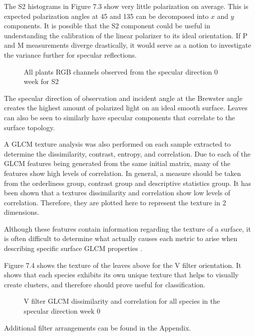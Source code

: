 The S2 histograms in Figure 7.3 show very little polarization on average.  This is expected polarization angles at 45 and 135 can be decomposed into $x$ and $y$ components.  It is possible that the S2 component could be useful in understanding the calibration of the linear polarizer to its ideal orientation.  If P and M measurements diverge drastically, it would serve as a notion to investigate the variance further for specular reflections.
%
\begin{figure}[!htb]
    \begin{center}
    \end{center}
    \caption{All plants RGB channels observed from the specular direction 0 week for S2}
    \label{fig:polarization}
\end{figure}
%
The specular direction of observation and incident angle at the Brewster angle creates the highest amount of polarized light on an ideal smooth surface.  Leaves can also be seen to similarly have specular components that correlate to the surface topology.

A GLCM texture analysis was also performed on each sample extracted to determine the dissimilarity, contrast, entropy, and correlation. Due to each of the GLCM features being generated from the same initial matrix, many of the features show high levels of correlation.  In general, a measure should be taken from the orderliness group, contrast group and descriptive statistics group. It has been shown that a textures dissimilarity and correlation show low levels of correlation.  Therefore, they are plotted here to represent the texture in 2 dimensions.

Although these features contain information regarding the texture of a surface, it is often difficult to determine what actually causes each metric to arise when describing specific surface GLCM properties \cite{haralick}.

Figure 7.4 shows the texture of the leaves above for the V filter orientation.  It shows that each species exhibits its own unique texture that helps to visually create clusters, and therefore should prove useful for classification.
%
\begin{figure}[!htb]
    \begin{center}
    \end{center}
    \caption{V filter GLCM dissimilarity and correlation for all species in the specular direction week 0}
    \label{fig:polarization}
\end{figure}
%
Additional filter arrangements can be found in the Appendix.

